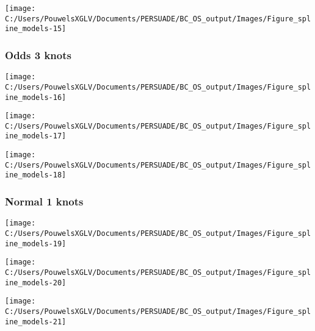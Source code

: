 \documentclass[
]{article}
\begin{document}
\begin{flushleft}\texttt{[image: C:/Users/PouwelsXGLV/Documents/PERSUADE/BC\_OS\_output/Images/Figure\_spline\_models-15]} \end{flushleft}

\clearpage

\subsubsection{Odds 3 knots}\label{odds-3-knots}

\begin{flushleft}\texttt{[image: C:/Users/PouwelsXGLV/Documents/PERSUADE/BC\_OS\_output/Images/Figure\_spline\_models-16]} \end{flushleft}

\begin{flushleft}\texttt{[image: C:/Users/PouwelsXGLV/Documents/PERSUADE/BC\_OS\_output/Images/Figure\_spline\_models-17]} \end{flushleft}

\begin{flushleft}\texttt{[image: C:/Users/PouwelsXGLV/Documents/PERSUADE/BC\_OS\_output/Images/Figure\_spline\_models-18]} \end{flushleft}

\clearpage

\subsubsection{Normal 1 knots}\label{normal-1-knots}

\begin{flushleft}\texttt{[image: C:/Users/PouwelsXGLV/Documents/PERSUADE/BC\_OS\_output/Images/Figure\_spline\_models-19]} \end{flushleft}

\begin{flushleft}\texttt{[image: C:/Users/PouwelsXGLV/Documents/PERSUADE/BC\_OS\_output/Images/Figure\_spline\_models-20]} \end{flushleft}

\begin{flushleft}\texttt{[image: C:/Users/PouwelsXGLV/Documents/PERSUADE/BC\_OS\_output/Images/Figure\_spline\_models-21]} \end{flushleft}

\clearpage
\end{document}
